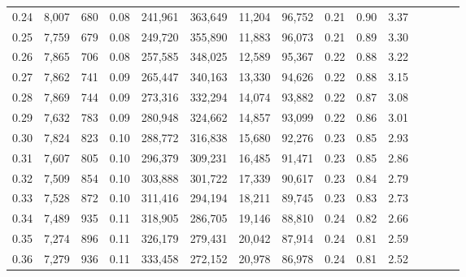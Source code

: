 \begin{tabular}{rrrcrrrrrrrrrrr}
0.24 &   8,007 &     680 &                                       0.08 &  241,961 &  363,649 &   11,204 &   96,752 &  0.21 &  0.90 &                         3.37 \\
0.25 &   7,759 &     679 &                                       0.08 &  249,720 &  355,890 &   11,883 &   96,073 &  0.21 &  0.89 &                         3.30 \\
0.26 &   7,865 &     706 &                                       0.08 &  257,585 &  348,025 &   12,589 &   95,367 &  0.22 &  0.88 &                         3.22 \\
0.27 &   7,862 &     741 &                                       0.09 &  265,447 &  340,163 &   13,330 &   94,626 &  0.22 &  0.88 &                         3.15 \\
0.28 &   7,869 &     744 &                                       0.09 &  273,316 &  332,294 &   14,074 &   93,882 &  0.22 &  0.87 &                         3.08 \\
0.29 &   7,632 &     783 &                                       0.09 &  280,948 &  324,662 &   14,857 &   93,099 &  0.22 &  0.86 &                         3.01 \\
0.30 &   7,824 &     823 &                                       0.10 &  288,772 &  316,838 &   15,680 &   92,276 &  0.23 &  0.85 &                         2.93 \\
0.31 &   7,607 &     805 &                                       0.10 &  296,379 &  309,231 &   16,485 &   91,471 &  0.23 &  0.85 &                         2.86 \\
0.32 &   7,509 &     854 &                                       0.10 &  303,888 &  301,722 &   17,339 &   90,617 &  0.23 &  0.84 &                         2.79 \\
0.33 &   7,528 &     872 &                                       0.10 &  311,416 &  294,194 &   18,211 &   89,745 &  0.23 &  0.83 &                         2.73 \\
0.34 &   7,489 &     935 &                                       0.11 &  318,905 &  286,705 &   19,146 &   88,810 &  0.24 &  0.82 &                         2.66 \\
0.35 &   7,274 &     896 &                                       0.11 &  326,179 &  279,431 &   20,042 &   87,914 &  0.24 &  0.81 &                         2.59 \\
0.36 &   7,279 &     936 &                                       0.11 &  333,458 &  272,152 &   20,978 &   86,978 &  0.24 &  0.81 &                         2.52 \\

\end{tabular}
